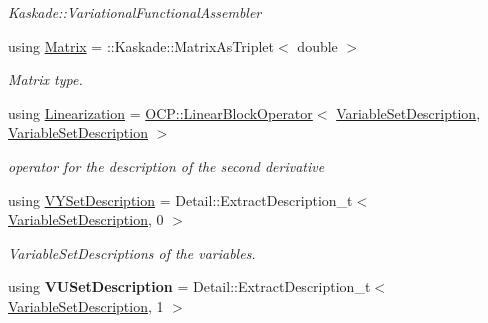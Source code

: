 \begin{DoxyCompactItemize}
\begin{DoxyCompactList}\small\item\em Kaskade\-::\-Variational\-Functional\-Assembler \end{DoxyCompactList}\item 
\hypertarget{classSpacy_1_1KaskadeParabolic_1_1C2Functional_a6b9f4dcd6b15dbcb5fce503fbd957adc}{using \hyperlink{classSpacy_1_1KaskadeParabolic_1_1C2Functional_a6b9f4dcd6b15dbcb5fce503fbd957adc}{Matrix} = \-::Kaskade\-::\-Matrix\-As\-Triplet$<$ double $>$}\label{classSpacy_1_1KaskadeParabolic_1_1C2Functional_a6b9f4dcd6b15dbcb5fce503fbd957adc}

\begin{DoxyCompactList}\small\item\em Matrix type. \end{DoxyCompactList}\item 
\hypertarget{classSpacy_1_1KaskadeParabolic_1_1C2Functional_a21e92f3995a97298d1e7e9788edc34dd}{using \hyperlink{classSpacy_1_1KaskadeParabolic_1_1C2Functional_a21e92f3995a97298d1e7e9788edc34dd}{Linearization} = \hyperlink{classSpacy_1_1KaskadeParabolic_1_1OCP_1_1LinearBlockOperator}{O\-C\-P\-::\-Linear\-Block\-Operator}$<$ \hyperlink{classSpacy_1_1KaskadeParabolic_1_1C2Functional_a234ab8fa6f10a5828fd7e26af1897aa6}{Variable\-Set\-Description}, \hyperlink{classSpacy_1_1KaskadeParabolic_1_1C2Functional_a234ab8fa6f10a5828fd7e26af1897aa6}{Variable\-Set\-Description} $>$}\label{classSpacy_1_1KaskadeParabolic_1_1C2Functional_a21e92f3995a97298d1e7e9788edc34dd}

\begin{DoxyCompactList}\small\item\em operator for the description of the second derivative \end{DoxyCompactList}\item 
\hypertarget{classSpacy_1_1KaskadeParabolic_1_1C2Functional_ad82d9aa77004c74e76f8ff25cd9c0c97}{using \hyperlink{classSpacy_1_1KaskadeParabolic_1_1C2Functional_ad82d9aa77004c74e76f8ff25cd9c0c97}{V\-Y\-Set\-Description} = Detail\-::\-Extract\-Description\-\_\-t$<$ \hyperlink{classSpacy_1_1KaskadeParabolic_1_1C2Functional_a234ab8fa6f10a5828fd7e26af1897aa6}{Variable\-Set\-Description}, 0 $>$}\label{classSpacy_1_1KaskadeParabolic_1_1C2Functional_ad82d9aa77004c74e76f8ff25cd9c0c97}

\begin{DoxyCompactList}\small\item\em Variable\-Set\-Descriptions of the variables. \end{DoxyCompactList}\item 
\hypertarget{classSpacy_1_1KaskadeParabolic_1_1C2Functional_a5c204db11bbd91b26b6af7c7411681db}{using {\bfseries V\-U\-Set\-Description} = Detail\-::\-Extract\-Description\-\_\-t$<$ \hyperlink{classSpacy_1_1KaskadeParabolic_1_1C2Functional_a234ab8fa6f10a5828fd7e26af1897aa6}{Variable\-Set\-Description}, 1 $>$}\label{classSpacy_1_1KaskadeParabolic_1_1C2Functional_a5c204db11bbd91b26b6af7c7411681db}


\end{DoxyCompactItemize}
